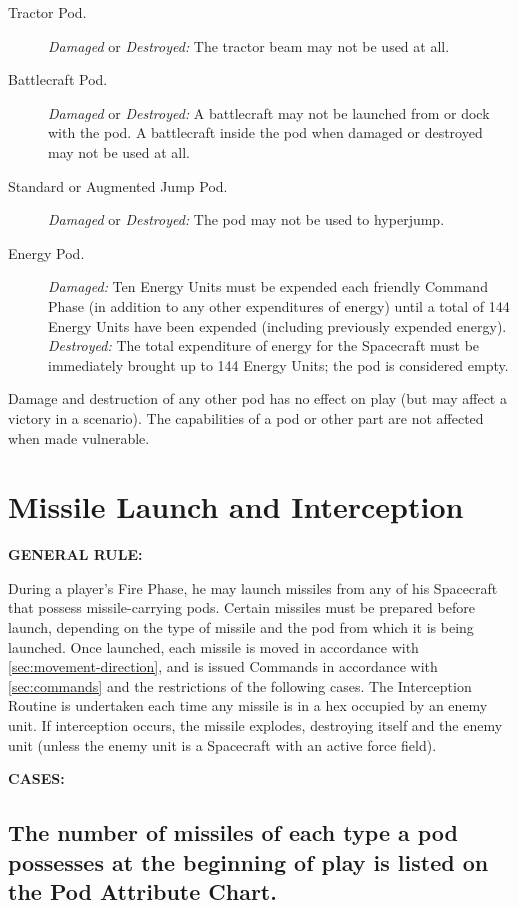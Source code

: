 \begin{description}
\item[Tractor Pod.] \emph{Damaged} or \emph{Destroyed:} The tractor beam may
  not be used at all.
\item[Battlecraft Pod.] \emph{Damaged} or \emph{Destroyed:} A battlecraft may
  not be launched from or dock with the pod. A battlecraft inside the
  pod when damaged or destroyed may not be used at all.
\item[Standard or Augmented Jump Pod.] \emph{Damaged} or \emph{Destroyed:}
  The pod may not be used to hyperjump.
\item[Energy Pod.] \emph{Damaged:} Ten Energy Units must be expended
  each friendly Command Phase (in addition to any other expenditures
  of energy) until a total of 144 Energy Units have been expended
  (including previously expended energy). \emph{Destroyed:} The total
  expenditure of energy for the Spacecraft must be immediately
  brought up to 144 Energy Units; the pod is considered empty.
\end{description}

Damage and destruction of any other pod has no effect on play (but may
affect a victory in a scenario). The capabilities of a pod or other
part are not affected when made vulnerable.

\section{Missile Launch and Interception}
\label{sec:miss-launch-interc}

\noindent\textbf{GENERAL RULE:}

During a player's Fire Phase, he may launch missiles from any of his
Spacecraft that possess missile-carrying pods. Certain missiles must
be prepared before launch, depending on the type of missile and the
pod from which it is being launched. Once launched, each missile is
moved in accordance with \ref{sec:movement-direction}, and is issued
Commands in accordance 
with \ref{sec:commands} and the restrictions of the following cases.  The
Interception Routine is undertaken each time any missile is in a hex
occupied by an enemy unit. If interception occurs, the missile
explodes, destroying itself and the enemy unit (unless the enemy unit
is a Spacecraft with an active force field).

\medskip

\noindent\textbf{CASES:}

\subsection[Number Of Missiles]{The number of missiles of each type a
  pod possesses at the beginning of play is listed on the Pod  
  Attribute Chart.}
\label{sec:number-of-missiles}



